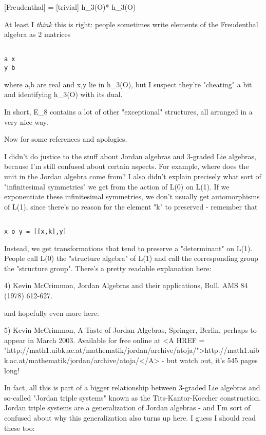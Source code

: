 [Freudenthal] = [trivial] \oplus  h_{3}(O)* \oplus  h_{3}(O) \oplus  [trivial] 
$$
    
At least I \emph{think} this is right: people sometimes write elements
of the Freudenthal algebra as 2 matrices


\begin{verbatim}

a x 
y b
\end{verbatim}
    
where a,b are real and x,y lie in h_{3}(O), but I suspect they're
"cheating" a bit and identifying h_{3}(O) with its dual.  

In short, E_{8} contains a lot of other
"exceptional" structures, all arranged in a very nice way.

Now for some references and apologies.

I didn't do justice to the stuff about Jordan algebras and 3-graded
Lie algebras, because I'm still confused about certain aspects.  For
example, where does the unit in the Jordan algebra come from?  I also
didn't explain precisely what sort of "infinitesimal
symmetries" we get from the action of L(0) on L(1).  If we
exponentiate these infinitesimal symmetries, we don't usually get
automorphisms of L(1), since there's no reason for the element
"k" to preserved - remember that


\begin{verbatim}

x o y = [[x,k],y]
\end{verbatim}
    
Instead, we get transformations that tend to preserve a "determinant"
on L(1).  People call L(0) the "structure algebra" of L(1) and call 
the corresponding group the "structure group".  There's a pretty 
readable explanation here:

4) Kevin McCrimmon, Jordan Algebras and their applications, Bull. 
AMS 84 (1978) 612-627.

and hopefully even more here:

5) Kevin McCrimmon, A Taste of Jordan Algebras, Springer, Berlin,
perhaps to appear in March 2003.  Available for free online at
<A HREF = "http://math1.uibk.ac.at/mathematik/jordan/archive/atoja/">http://math1.uibk.ac.at/mathematik/jordan/archive/atoja/</A> - but watch out,
it's 545 pages long!

In fact, all this is part of a bigger relationship between 3-graded 
Lie algebras and so-called "Jordan triple systems" known as the
Tits-Kantor-Koecher construction.  Jordan triple systems are a
generalization of Jordan algebras - and I'm sort of confused about 
why this generalization also turns up here.  I guess I should read
these too:

